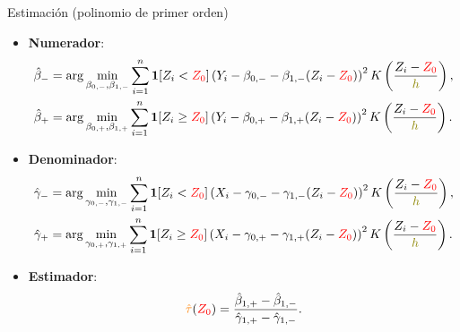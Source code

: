 \documentclass[10pt, xcolor=dvipsnames]{beamer}
\begin{document}
\begin{frame}{Estimación (polinomio de primer orden)}
\begin{itemize}
    \item \textbf{Numerador}: \vspace{-1em}
    {\small
    \begin{align*}
\hat{\beta}_- &= \arg\min_{\beta_{0,-},\beta_{1,-}} \sum_{i=1}^{n} \mathbf{1}[Z_i < \textcolor{red}{Z_0}] \left(Y_i - \beta_{0,-} - \beta_{1,-}(Z_i - \textcolor{red}{Z_0})\right)^2 K\left(\frac{Z_i - \textcolor{red}{Z_0}}{\textcolor{olive}{h}}\right), \\
\hat{\beta}_+ &= \arg\min_{\beta_{0,+},\beta_{1,+}} \sum_{i=1}^{n} \mathbf{1}[Z_i \geq \textcolor{red}{Z_0}] \left(Y_i - \beta_{0,+} - \beta_{1,+}(Z_i - \textcolor{red}{Z_0})\right)^2 K\left(\frac{Z_i - \textcolor{red}{Z_0}}{\textcolor{olive}{h}}\right).
\end{align*}
}
\item \textbf{Denominador}: \vspace{-1em}
{\small
    \begin{align*}
\hat{\gamma}_- &= \arg\min_{\gamma_{0,-},\gamma_{1,-}} \sum_{i=1}^{n} \mathbf{1}[Z_i < \textcolor{red}{Z_0}] \left(X_i - \gamma_{0,-} - \gamma_{1,-}(Z_i - \textcolor{red}{Z_0})\right)^2 K\left(\frac{Z_i - \textcolor{red}{Z_0}}{\textcolor{olive}{h}}\right), \\
\hat{\gamma}_+ &= \arg\min_{\gamma_{0,+},\gamma_{1,+}} \sum_{i=1}^{n} \mathbf{1}[Z_i \geq \textcolor{red}{Z_0}] \left(X_i - \gamma_{0,+} - \gamma_{1,+}(Z_i - \textcolor{red}{Z_0})\right)^2 K\left(\frac{Z_i - \textcolor{red}{Z_0}}{\textcolor{olive}{h}}\right).
\end{align*}
}
    \item \textbf{Estimador}: \vspace{-0.5em} \[ \textcolor{orange}{\hat{\tau}}(\textcolor{red}{Z_0}) = \frac{\hat{\beta}_{1,+} - \hat{\beta}_{1,-}}{\hat{\gamma}_{1,+} - \hat{\gamma}_{1,-}}. \]
\end{itemize}
\end{frame}



\end{document}

